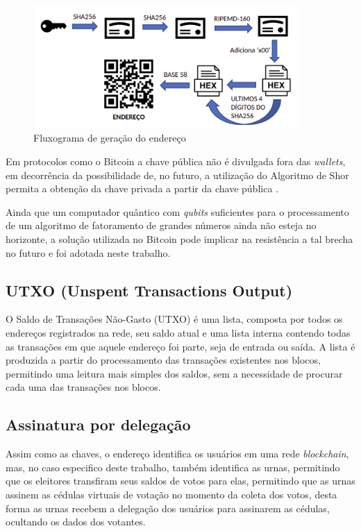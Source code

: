 \begin{figure}[!h]
	\centering
	\includegraphics[width=0.9\textwidth]{imagens/fluxo_endereco}
	\caption{Fluxograma de geração do endereço}
	\label{fig:fluxo_endereco}
\end{figure}

Em protocolos como o Bitcoin a chave pública não é divulgada fora das \textit{wallets}, em decorrência da possibilidade de, no futuro, a utilização do Algoritmo de Shor permita a obtenção da chave privada a partir da chave pública \cite{Mavroeidis2018}. 

Ainda que um computador quântico com \textit{\glspl{qubit}} suficientes para o processamento de um algoritmo de fatoramento de grandes números ainda não esteja no horizonte, a solução utilizada no Bitcoin pode implicar na resistência a tal brecha no futuro e foi adotada neste trabalho. 

\subsection{UTXO (Unspent Transactions Output)}

O Saldo de Transações Não-Gasto (UTXO) é uma lista, composta por todos os endereços registrados na rede, seu saldo atual e uma lista interna contendo todas as transações em que aquele endereço foi parte, seja de entrada ou saída. A lista é produzida a partir do processamento das transações existentes nos blocos, permitindo uma leitura mais simples dos saldos, sem a necessidade de procurar cada uma das transações nos blocos.

\subsection{Assinatura por delegação}

Assim como as chaves, o endereço identifica os usuários em uma rede \textit{blockchain}, mas, no caso especifico deste trabalho, também identifica as urnas, permitindo que os eleitores transfiram seus saldos de votos para elas, permitindo que as urnas assinem as cédulas virtuais de votação no momento da coleta dos votos, desta forma as urnas recebem a delegação dos usuários para assinarem as cédulas, ocultando os dados dos votantes.

